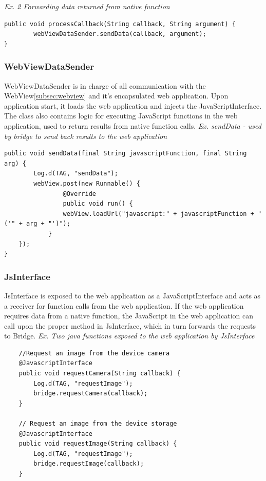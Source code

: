 \emph{Ex. 2 Forwarding data returned from native function}
\begin{lstlisting}
public void processCallback(String callback, String argument) {
        webViewDataSender.sendData(callback, argument);
}
\end{lstlisting}
	
\subsubsection{WebViewDataSender}
WebViewDataSender is in charge of all communication with the WebView\ref{subsec:webview} and it's encapsulated web application. Upon application start, it loads the web application and injects the JavaScriptInterface. The class also contains logic for executing JavaScript functions in the web application, used to return results from native function calls.
\emph{Ex. sendData - used by bridge to send back results to the web application}
\begin{lstlisting}
public void sendData(final String javascriptFunction, final String arg) {
        Log.d(TAG, "sendData");
        webView.post(new Runnable() {
            	@Override
            	public void run() {
        		webView.loadUrl("javascript:" + javascriptFunction + "('" + arg + "')");
    		}
	});
}
\end{lstlisting}
	
\subsubsection{JsInterface}
JsInterface is exposed to the web application as a JavaScriptInterface and acts as a receiver for function calls from the web application. If the web application requires data from a native function, the JavaScript in the web application can call upon the proper method in JsInterface, which in turn forwards the requests to Bridge.
\emph{Ex. Two java functions exposed to the web application by JsInterface}
\begin{lstlisting}
    //Request an image from the device camera
    @JavascriptInterface
    public void requestCamera(String callback) {
        Log.d(TAG, "requestImage");
        bridge.requestCamera(callback);
    }

    // Request an image from the device storage
    @JavascriptInterface
    public void requestImage(String callback) {
        Log.d(TAG, "requestImage");
        bridge.requestImage(callback);
    }
\end{lstlisting}

